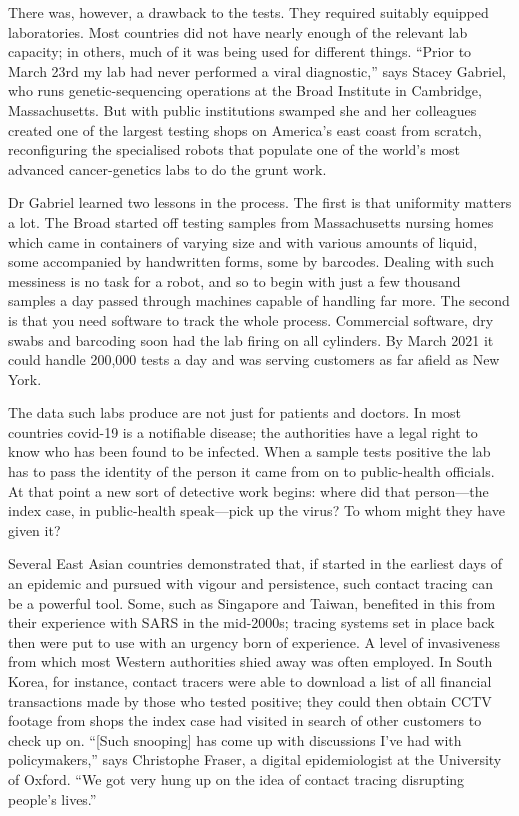 \documentclass{article}
\begin{document}
There was, however, a drawback to the tests. They required suitably equipped laboratories. Most countries did not have nearly enough of the relevant lab capacity; in others, much of it was being used for different things. ``Prior to March 23rd my lab had never performed a viral diagnostic,'' says Stacey Gabriel, who runs genetic-sequencing operations at the Broad Institute in Cambridge, Massachusetts. But with public institutions swamped she and her colleagues created one of the largest testing shops on America's east coast from scratch, reconfiguring the specialised robots that populate one of the world's most advanced cancer-genetics labs to do the grunt work. 

Dr Gabriel learned two lessons in the process. The first is that uniformity matters a lot. The Broad started off testing samples from Massachusetts nursing homes which came in containers of varying size and with various amounts of liquid, some accompanied by handwritten forms, some by barcodes. Dealing with such messiness is no task for a robot, and so to begin with just a few thousand samples a day passed through machines capable of handling far more. The second is that you need software to track the whole process. Commercial software, dry swabs and barcoding soon had the lab firing on all cylinders. By March 2021 it could handle 200,000 tests a day and was serving customers as far afield as New York. 

The data such labs produce are not just for patients and doctors. In most countries covid-19 is a notifiable disease; the authorities have a legal right to know who has been found to be infected. When a sample tests positive the lab has to pass the identity of the person it came from on to public-health officials. At that point a new sort of detective work begins: where did that person---the index case, in public-health speak---pick up the virus? To whom might they have given it? 

Several East Asian countries demonstrated that, if started in the earliest days of an epidemic and pursued with vigour and persistence, such contact tracing can be a powerful tool. Some, such as Singapore and Taiwan, benefited in this from their experience with SARS in the mid-2000s; tracing systems set in place back then were put to use with an urgency born of experience. A level of invasiveness from which most Western authorities shied away was often employed. In South Korea, for instance, contact tracers were able to download a list of all financial transactions made by those who tested positive; they could then obtain CCTV footage from shops the index case had visited in search of other customers to check up on. ``{[}Such snooping{]} has come up with discussions I've had with policymakers,'' says Christophe Fraser, a digital epidemiologist at the University of Oxford. ``We got very hung up on the idea of contact tracing disrupting people's lives.'' 
\end{document}
